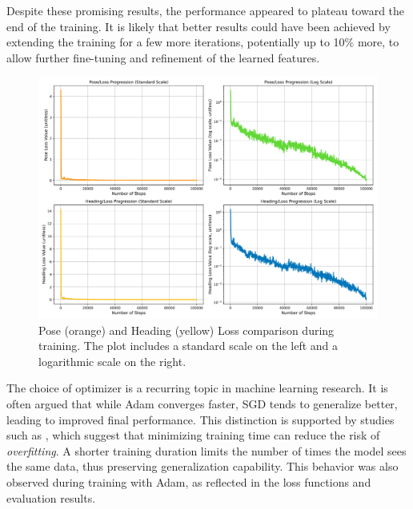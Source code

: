 Despite these promising results, the performance appeared to plateau toward the end of the training. It is likely that better results could have been achieved by extending the training for a few more iterations, potentially up to 10\% more, to allow further fine-tuning and refinement of the learned features.

\begin{figure}
    \centering
    \includegraphics[width=1\linewidth]{LateX//figs/BEV1_l1sDEG_pose_heading_loss_comparison.png}
    \caption{Pose (orange) and Heading (yellow) Loss comparison during training. The plot includes a standard scale on the left and a logarithmic scale on the right.}
    \label{fig:adam_loss_comparison}
\end{figure}

The choice of optimizer is a recurring topic in machine learning research. It is often argued that while Adam converges faster, SGD tends to generalize better, leading to improved final performance. This distinction is supported by studies such as \cite{DBLP:journals/corr/abs-1910-05446}, which suggest that minimizing training time can reduce the risk of \textit{overfitting}. A shorter training duration limits the number of times the model sees the same data, thus preserving generalization capability. This behavior was also observed during training with Adam, as reflected in the loss functions and evaluation results.


